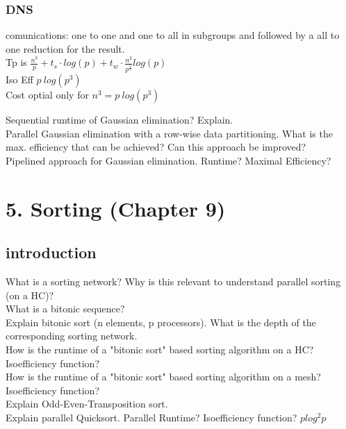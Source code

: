 \documentclass[a4paper,10pt,titlepage]{report}
\begin{document}
\subsubsection{DNS}
	   comunications: one to one and one to all in subgroups and followed by a all to one reduction for the result. \\
       Tp is $\frac{n^3}{p}+ t_s \cdot log(p) +t_w\cdot \frac{n^2}{p^\frac{2}{3}} log (p)$\\
       Iso Eff $p \ log (p^3)$\\
       Cost optial only for $n^3 = p \ log (p^3)$ \\
       
       \vspace{5mm}
       
       Sequential runtime of Gaussian elimination? Explain.\\
       Parallel Gaussian elimination with a row-wise data partitioning. What is the max. efficiency that can be achieved? Can this approach be improved?\\
       Pipelined approach for Gaussian elimination. Runtime? Maximal Efficiency?\\

\newpage
\section{
5. Sorting (Chapter 9)}
\subsection{introduction}
    What is a sorting network? Why is this relevant to understand parallel sorting (on a HC)?\\
    What is a bitonic sequence?\\
    Explain bitonic sort (n elements, p processors).  What is the depth of the corresponding sorting network.\\
    How is the runtime of a "bitonic sort" based sorting algorithm on a HC? Isoefficiency function?\\
    How is the runtime of a "bitonic sort" based sorting algorithm on a mesh? Isoefficiency function?\\
    Explain Odd-Even-Transposition sort.\\
    Explain parallel Quicksort. Parallel Runtime? Isoefficiency function? $p log^2 p$ \\
    
    
    
\newpage
\end{document}
